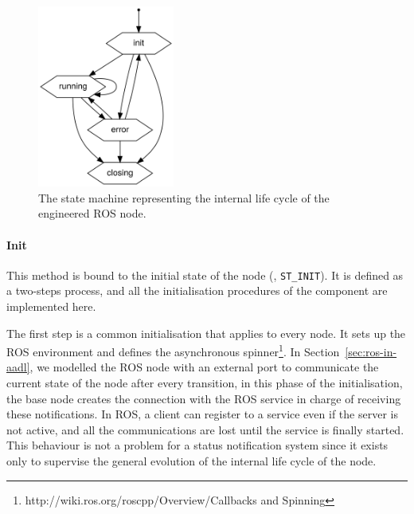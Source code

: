 \begin{figure}[t]
    \centering
    \includegraphics[width=0.4\textwidth]{gfx/state_machine}
    \caption{The state machine representing the internal life cycle of the engineered ROS node.}\label{fig:state-machine}
\end{figure}

\paragraph{Init} This method is bound to the initial state of the node (\ie, \texttt{ST\_INIT}). It is defined as a two-steps process, and all the initialisation procedures of the component are implemented here.

The first step is a common initialisation that applies to every node. It sets up the ROS environment and defines the asynchronous spinner\footnote{http://wiki.ros.org/roscpp/Overview/Callbacks and Spinning}. In Section~\ref{sec:ros-in-aadl}, we modelled the ROS node with an external port to communicate the current state of the node after every transition, in this phase of the initialisation, the base node creates the connection with the ROS service in charge of receiving these notifications. In ROS, a client can register to a service even if the server is not active, and all the communications are lost until the service is finally started. This behaviour is not a problem for a status notification system since it exists only to supervise the general evolution of the internal life cycle of the node.

